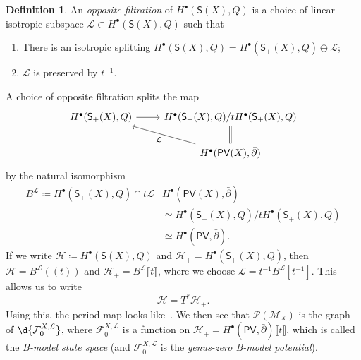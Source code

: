 \documentclass{amsart}
\theoremstyle{definition}
\newtheorem{defn}[thm]{Definition}
\theoremstyle{remark}
\theoremstyle{plain}
\theoremstyle{definition}
\theoremstyle{remark}
\newcommand{\mc}[1]{\mathcal{#1}}
\newcommand{\ms}[1]{\mathsf{#1}}
\newcommand{\1}{\mathbf{1}}
\newcommand{\2}{\mathbf{2}}
\newcommand{\3}{\mathbf{3}}
\newcommand{\ps}[1]{\lBrack #1 \rBrack}
\newcommand{\ls}[1]{(\!( #1 )\!)}
\newcommand{\dbar}{\bar{\partial}}
\begin{document}
\begin{defn}
    An \textit{opposite filtration} of \(H^{\bullet}(\ms{S}(X), Q)\) is a choice of linear isotropic subspace \(\mc{L} \subset H^{\bullet}(\ms{S}(X), Q)\) such that
    \begin{enumerate}
        \item There is an isotropic splitting \(H^{\bullet}(\ms{S}(X), Q) = H^{\bullet}(\ms{S}_+(X), Q) \oplus \mc{L}\);
        \item \(\mc{L}\) is preserved by \(t^{-1}\).
    \end{enumerate}
\end{defn}

A choice of opposite filtration splits the map
\begin{equation*}
\begin{tikzcd}
     H^{\bullet}(\ms{S}_+(X), Q) \ar{r} & H^{\bullet}(\ms{S}_+(X), Q) / t H^{\bullet}(\ms{S}_+(X), Q) \ar[equals]{d} \\
     & H^{\bullet}(\ms{PV}(X), \dbar) \ar{ul}{\mc{L}}
\end{tikzcd}
\end{equation*}
by the natural isomorphism
\begin{align*}
    B^{\mc{L}} \coloneqq H^{\bullet}(\ms{S}_+(X), Q) \cap t \mc{L} & H^{\bullet}(\ms{PV}(X), \dbar) \\
    &\simeq H^{\bullet}(\ms{S}_+(X), Q) / t H^{\bullet}(\ms{S}_+(X), Q) \\ 
    &\simeq H^{\bullet}(\ms{PV}, \dbar).
\end{align*}
If we write \(\mc{H} \coloneqq H^{\bullet}(\ms{S}(X), Q)\) and \(\mc{H}_+ = H^{\bullet}(\ms{S}_+(X), Q)\), then \(\mc{H} = B^{\mc{L}}\ls{t}\) and \(\mc{H}_+ = B^{\mc{L}} \ps{t}\), where we choose \(\mc{L} = t^{-1} B^{\mc{L}} [t^{-1}]\). This allows us to write
\[ \mc{H} = T^* \mc{H}_+. \]
Using this, the period map looks like~. We then see that \(\mc{P}(\mc{M}_X)\) is the graph of \(\d{\mc{F}_0^{X, \mc{L}}}\), where \(\mc{F}_0^{X, \mc{L}}\) is a function on \(\mc{H}_+ = H^{\bullet}(\ms{PV}, \dbar) \ps{t}\), which is called the \textit{B-model state space} (and \(\mc{F}_0^{X, \mc{L}}\) is the \textit{genus-zero B-model potential}).
\end{document}
